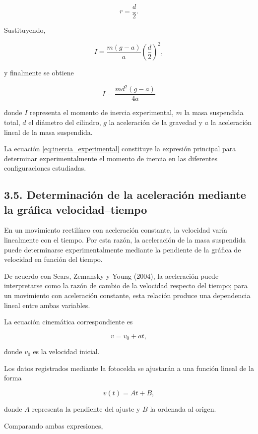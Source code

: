 \documentclass[11pt,a4paper]{article}
\begin{document}
\[
r=\frac{d}{2}.
\]

Sustituyendo,

\[
I=
\frac{m(g-a)}{a}
\left(\frac{d}{2}\right)^2,
\]

y finalmente se obtiene

\begin{equation}
I=
\frac{md^2(g-a)}{4a}
\label{eq:inercia_experimental}
\end{equation}

donde \(I\) representa el momento de inercia experimental, \(m\) la masa
suspendida total, \(d\) el diámetro del cilindro, \(g\) la aceleración de
la gravedad y \(a\) la aceleración lineal de la masa suspendida.

La ecuación \eqref{eq:inercia_experimental} constituye la expresión
principal para determinar experimentalmente el momento de inercia en las
diferentes configuraciones estudiadas.



\subsection*{3.5. Determinación de la aceleración mediante la gráfica
velocidad--tiempo}

En un movimiento rectilíneo con aceleración constante, la velocidad varía
linealmente con el tiempo. Por esta razón, la aceleración de la masa
suspendida puede determinarse experimentalmente mediante la pendiente de
la gráfica de velocidad en función del tiempo.

De acuerdo con Sears, Zemansky y Young (2004), la aceleración puede
interpretarse como la razón de cambio de la velocidad respecto del tiempo;
para un movimiento con aceleración constante, esta relación produce una
dependencia lineal entre ambas variables.

La ecuación cinemática correspondiente es

\[
v=v_0+at,
\]

donde \(v_0\) es la velocidad inicial.

Los datos registrados mediante la fotocelda se ajustarán a una función
lineal de la forma

\[
v(t)=At+B,
\]

donde \(A\) representa la pendiente del ajuste y \(B\) la ordenada al
origen.

Comparando ambas expresiones,
\end{document}

